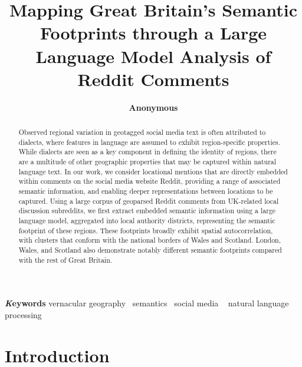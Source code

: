 \documentclass[
]{article}
\title{Mapping Great Britain's Semantic Footprints through a Large
Language Model Analysis of Reddit Comments}
\author{\textbf{Anonymous}\\}
\date{}
\begin{document}
\maketitle
\begin{abstract}
Observed regional variation in geotagged social media text is often
attributed to dialects, where features in language are assumed to
exhibit region-specific properties. While dialects are seen as a key
component in defining the identity of regions, there are a multitude of
other geographic properties that may be captured within natural language
text. In our work, we consider locational mentions that are directly
embedded within comments on the social media website Reddit, providing a
range of associated semantic information, and enabling deeper
representations between locations to be captured. Using a large corpus
of geoparsed Reddit comments from UK-related local discussion
subreddits, we first extract embedded semantic information using a large
language model, aggregated into local authority districts, representing
the semantic footprint of these regions. These footprints broadly
exhibit spatial autocorrelation, with clusters that conform with the
national borders of Wales and Scotland. London, Wales, and Scotland also
demonstrate notably different semantic footprints compared with the rest
of Great Britain.
\end{abstract}
{\bfseries \emph Keywords}
\def\sep{\textbullet\ }
vernacular geography \sep semantics \sep social media \sep 
natural language processing


\section{Introduction}\label{introduction}
\end{document}

